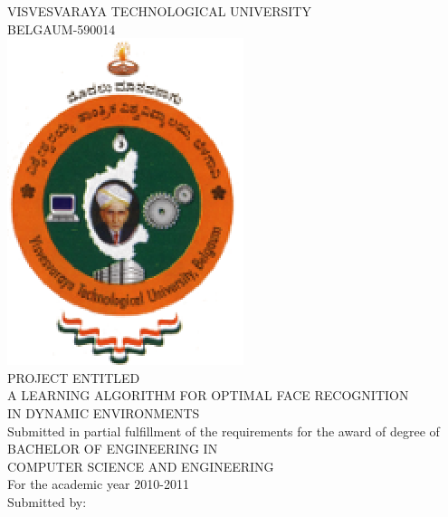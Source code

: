 \newcommand{\tab}{\hspace*{8 cm}}

%
\begin{center}
\thispagestyle{empty}

\large{VISVESVARAYA TECHNOLOGICAL UNIVERSITY \\ BELGAUM-590014 } \\
\vspace{1mm}
\includegraphics{mspicture.eps}
\vspace{2mm}
\\
\normalsize{PROJECT ENTITLED}\\
\vspace{2mm}
\Large{A LEARNING ALGORITHM FOR OPTIMAL FACE RECOGNITION \\ IN DYNAMIC ENVIRONMENTS}\\
\vspace{3mm}
\normalsize{Submitted in partial fulfillment of the requirements for the award of degree of \\}
\vspace{1mm}
\large{BACHELOR OF ENGINEERING IN }\\
\large{COMPUTER SCIENCE AND ENGINEERING}\\
\vspace{1mm}
\normalsize{For the academic year 2010-2011\\}
\vspace{3mm}
\large{Submitted by:} \\
\begin{table}[h]
\begin{tabular}{lr}

\end{tabular}
\end{table}
\end{center}
